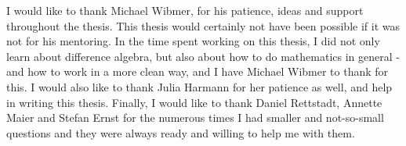 I would like to thank Michael Wibmer, for his patience, ideas and support throughout the thesis. This thesis would certainly not have been possible if it was not for his mentoring.
In the time spent working on this thesis, I did not only learn about difference algebra, but also about how to do mathematics in general - and how to work in a more clean way, and I have Michael Wibmer to thank for this.
I would also like to thank Julia Harmann for her patience as well, and help in writing this thesis.
Finally, I would like to thank Daniel Rettstadt, Annette Maier and Stefan Ernst for the numerous times I had smaller and not-so-small questions and they were always ready and willing to help me with them.
